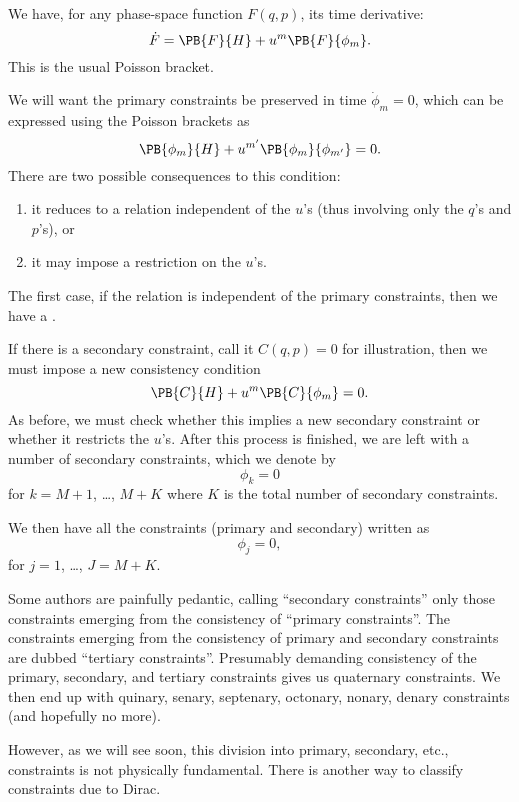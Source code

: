 
\label{chunk:constrained-hamiltonian:constraint:initial-form-of-equations-of-motion-using-poisson-brackets}
We have, for any phase-space function $F(q,p)$, its time derivative:
\begin{equation}
\dot{F} = \PB{F}{H} + u^{m}\PB{F}{\phi_{m}}.
\end{equation}
This is the usual Poisson bracket.

We will want the primary constraints be preserved in time
$\dot{\phi}_{m}=0$, which can be expressed using the Poisson brackets as
\begin{equation}
\PB{\phi_{m}}{H} + u^{m'}\PB{\phi_{m}}{\phi_{m'}}=0.
\end{equation}
There are two possible consequences to this condition:
\begin{enumerate}
\item it reduces to a relation independent of the $u$'s (thus involving
  only the $q$'s and $p$'s), or
\item it may impose a restriction on the $u$'s.
\end{enumerate}
The first case, if the relation is independent of the primary
constraints, then we have a .

\M
If there is a secondary constraint, call it $C(q,p)=0$ for illustration,
then we must impose a new consistency condition
\begin{equation}
\PB{C}{H} + u^{m}\PB{C}{\phi_{m}}=0.
\end{equation}
As before, we must check whether this implies a new secondary constraint
or whether it restricts the $u$'s. After this process is finished, we
are left with a number of secondary constraints, which we denote
by
\begin{equation}
\phi_{k}=0
\end{equation}
for $k=M+1$, \dots, $M+K$ where $K$ is the total number of secondary
constraints. 

We then have all the constraints (primary and secondary) written as
\begin{equation}
\phi_{j} = 0,
\end{equation}
for $j=1$, \dots, $J=M+K$.

\begin{remark}
Some authors are painfully pedantic, calling ``secondary constraints''
only those constraints emerging from the consistency of ``primary constraints''.
The constraints emerging from the consistency of primary and secondary
constraints are dubbed ``tertiary constraints''. Presumably demanding
consistency of the primary, secondary, and tertiary constraints gives us
quaternary constraints. We then end up with quinary, senary, septenary,
octonary, nonary, denary constraints (and hopefully no more).

However, as we will see soon, this division into primary, secondary,
etc., constraints is not physically fundamental. There is another way to
classify constraints due to Dirac.
\end{remark}

